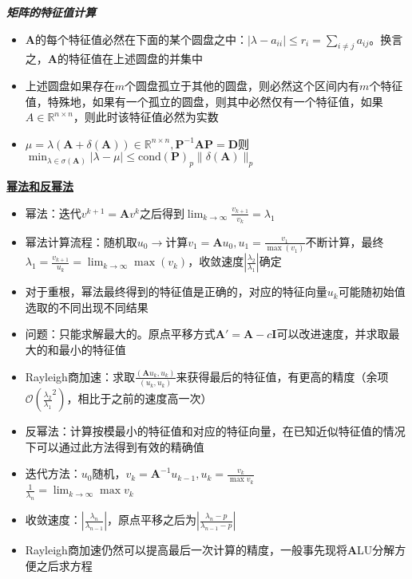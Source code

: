\documentclass[UTF8,a4paper,landscape,compress]{paper}
\renewcommand{\subsection}[1]{{\small\textbf{\underline{#1}}}\\ }
\renewcommand{\section}[1]{{\normalsize\textbf{\emph{#1}}}\\ }
\newcommand{\List}[1]{\begin{itemize}[fullwidth,itemindent=0em] #1 \end{itemize}}
\begin{document}
\begin{multicols}{4}
\section{矩阵的特征值计算}
    \List{
        \item {$\bm A$的每个特征值必然在下面的某个圆盘之中：$|\lambda -a_{ii}| \le r_i =\sum_{i\ne j}a_{ij}$。换言之，$\bm A$的特征值在上述圆盘的并集中}
        \item {上述圆盘如果存在$m$个圆盘孤立于其他的圆盘，则必然这个区间内有$m$个特征值，特殊地，如果有一个孤立的圆盘，则其中必然仅有一个特征值，如果$A\in\mathbb R^{n\times n}$，则此时该特征值必然为实数}
        \item {$\mu =\lambda(\bm A + \delta(\bm A))\in \mathbb R^{n\times n}, \bm P^{-1}\bm A\bm P = \bm D$则$\min_{\lambda\in\sigma(\bm A)}|\lambda-\mu| \le \mathrm{cond}(\bm P)_p\|\delta(\bm A)\|_p$}
    }
    \subsection{幂法和反幂法}
    \List{
        \item {幂法：迭代$v^{k+1} = \bm Av^k$之后得到$\lim_{k\to\infty}\frac{v_{k+1}}{v_k} = \lambda_1$}
        \item {幂法计算流程：随机取$u_0\rightarrow$计算$v_1 = \bm Au_0,u_1 = \frac{v_1}{\max(v_1)}$不断计算，最终$\lambda_1 = \frac{v_{k+1}}{u_k} = \lim_{k\to\infty}\max(v_k)$，收敛速度$|\frac{\lambda_2}{\lambda_1}|$确定}
        \item {对于重根，幂法最终得到的特征值是正确的，对应的特征向量$u_k$可能随初始值选取的不同出现不同结果}
        \item {问题：只能求解最大的。原点平移方式$\bm A' = \bm A - c\bm I$可以改进速度，并求取最大的和最小的特征值}
        \item {Rayleigh商加速：求取$\frac{(\bm Au_k,u_k)}{(u_k,u_k)}$来获得最后的特征值，有更高的精度（余项$\mathcal O(\frac {\lambda_2}{\lambda_1}^2)$，相比于之前的速度高一次）}
        \item {反幂法：计算按模最小的特征值和对应的特征向量，在已知近似特征值的情况下可以通过此方法得到有效的精确值}
        \item {迭代方法：$u_0$随机，$v_k = \bm A^{-1}u_{k-1},u_k = \frac{v_k}{\max v_k}$\\ $\frac 1{\lambda_n} = \lim_{k\to\infty}\max v_k$}
        \item {收敛速度：$|\frac{\lambda_n}{\lambda_{n-1}}|$，原点平移之后为$|\frac{\lambda_n - p}{\lambda_{n-1} - p}|$}
        \item {Rayleigh商加速仍然可以提高最后一次计算的精度，一般事先现将$\bm A$LU分解方便之后求方程}
        }

\end{multicols}
\end{document}
